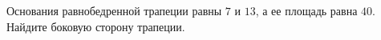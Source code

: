\begin{ex}
	\begin{condition}
		Основания равнобедренной трапеции равны \( 7  \) и \( 13 \), а ее площадь равна \( 40 \). Найдите боковую сторону трапеции.
	\end{condition}
\end{ex}